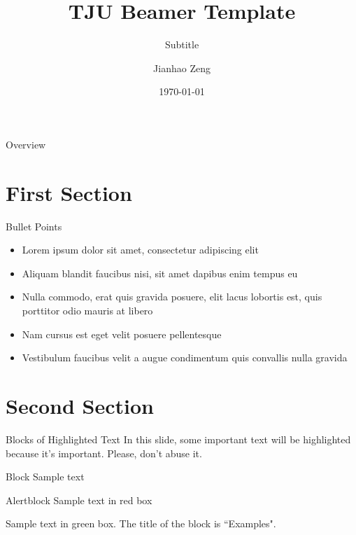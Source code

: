 \documentclass[aspectratio=169,xcolor=dvipsnames]{beamer}
\title[Short]{TJU Beamer Template}
\subtitle[Short]{Subtitle}
\author[Zeng]{Jianhao Zeng}
\institute{School of Electrical and Information Engineering \\ Tianjin University}
\date[2023]{\today}
\begin{document}
    \begin{frame}
        \titlepage
    \end{frame}

    \begin{frame}{Overview}
        \tableofcontents
    \end{frame}

\section{First Section}
\begin{frame}{Bullet Points}
    \begin{itemize}
        \item Lorem ipsum dolor sit amet, consectetur adipiscing elit
        \item Aliquam blandit faucibus nisi, sit amet dapibus enim tempus eu
        \item Nulla commodo, erat quis gravida posuere, elit lacus lobortis est, quis porttitor odio mauris at libero
        \item Nam cursus est eget velit posuere pellentesque
        \item Vestibulum faucibus velit a augue condimentum quis convallis nulla gravida
    \end{itemize}
\end{frame}

\section{Second Section}
\begin{frame}{Blocks of Highlighted Text}
    In this slide, some important text will be \alert{highlighted} because it's important. Please, don't abuse it.

    \begin{block}{Block}
        Sample text
    \end{block}

    \begin{alertblock}{Alertblock}
        Sample text in red box
    \end{alertblock}

    \begin{examples}
        Sample text in green box. The title of the block is ``Examples".
    \end{examples}
\end{frame}
\end{document}
